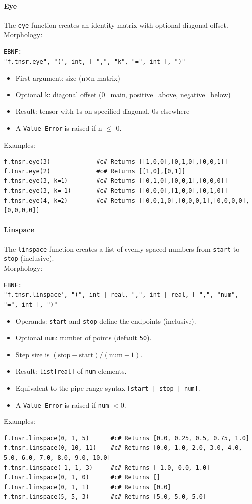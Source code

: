 \paragraph{Eye}
The \texttt{eye} function creates an identity matrix with optional diagonal offset.\\
Morphology:
\begin{verbatim}
EBNF:
"f.tnsr.eye", "(", int, [ ",", "k", "=", int ], ")"
\end{verbatim}
\begin{itemize}
\item First argument: size (n$\times$n matrix)
\item Optional k: diagonal offset (0=main, positive=above, negative=below)
\item Result: tensor with 1s on specified diagonal, 0s elsewhere
\item A \texttt{Value Error} is raised if n $\leq$ 0.
\end{itemize}
Examples:
\begin{verbatim}
f.tnsr.eye(3)             #c# Returns [[1,0,0],[0,1,0],[0,0,1]]
f.tnsr.eye(2)             #c# Returns [[1,0],[0,1]]
f.tnsr.eye(3, k=1)        #c# Returns [[0,1,0],[0,0,1],[0,0,0]]
f.tnsr.eye(3, k=-1)       #c# Returns [[0,0,0],[1,0,0],[0,1,0]]
f.tnsr.eye(4, k=2)        #c# Returns [[0,0,1,0],[0,0,0,1],[0,0,0,0],[0,0,0,0]]
\end{verbatim}

\paragraph{Linspace}
The \texttt{linspace} function creates a list of evenly spaced numbers from \texttt{start} to \texttt{stop} (inclusive).\\
Morphology:
\begin{verbatim}
EBNF:
"f.tnsr.linspace", "(", int | real, ",", int | real, [ ",", "num", "=", int ], ")"
\end{verbatim}
\begin{itemize}
\item Operands: \texttt{start} and \texttt{stop} define the endpoints (inclusive).
\item Optional \texttt{num}: number of points (default \texttt{50}).
\item Step size is $(\text{stop} - \text{start}) / (\text{num} - 1)$.
\item Result: \texttt{list[real]} of \texttt{num} elements.
\item Equivalent to the pipe range syntax \texttt{[start | stop | num]}.
\item A \texttt{Value Error} is raised if \texttt{num} $< 0$.
\end{itemize}
Examples:
\begin{verbatim}
f.tnsr.linspace(0, 1, 5)      #c# Returns [0.0, 0.25, 0.5, 0.75, 1.0]
f.tnsr.linspace(0, 10, 11)    #c# Returns [0.0, 1.0, 2.0, 3.0, 4.0, 5.0, 6.0, 7.0, 8.0, 9.0, 10.0]
f.tnsr.linspace(-1, 1, 3)     #c# Returns [-1.0, 0.0, 1.0]
f.tnsr.linspace(0, 1, 0)      #c# Returns []
f.tnsr.linspace(0, 1, 1)      #c# Returns [0.0]
f.tnsr.linspace(5, 5, 3)      #c# Returns [5.0, 5.0, 5.0]
\end{verbatim}


